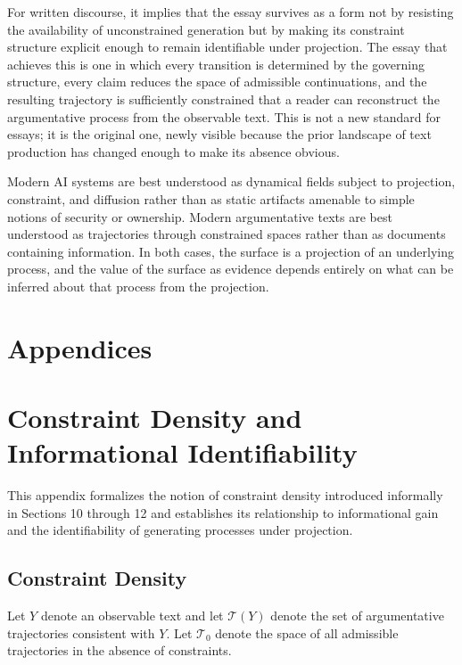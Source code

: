 \documentclass[12pt, oneside]{article}
\theoremstyle{plain}
\theoremstyle{definition}
\theoremstyle{remark}
\begin{document}
For written discourse, it implies that the essay survives as a form not by resisting the
availability of unconstrained generation but by making its constraint structure explicit
enough to remain identifiable under projection. The essay that achieves this is one in
which every transition is determined by the governing structure, every claim reduces the
space of admissible continuations, and the resulting trajectory is sufficiently constrained
that a reader can reconstruct the argumentative process from the observable text. This is
not a new standard for essays; it is the original one, newly visible because the prior
landscape of text production has changed enough to make its absence obvious.

Modern AI systems are best understood as dynamical fields subject to projection, constraint,
and diffusion rather than as static artifacts amenable to simple notions of security or
ownership. Modern argumentative texts are best understood as trajectories through constrained
spaces rather than as documents containing information. In both cases, the surface is a
projection of an underlying process, and the value of the surface as evidence depends
entirely on what can be inferred about that process from the projection.

\newpage 
\section*{Appendices}

\appendix
\section{Constraint Density and Informational Identifiability}

This appendix formalizes the notion of constraint density introduced informally in
Sections 10 through 12 and establishes its relationship to informational gain and
the identifiability of generating processes under projection.

\subsection{Constraint Density}

Let $Y$ denote an observable text and let $\mathcal{T}(Y)$ denote the set of
argumentative trajectories consistent with $Y$. Let $\mathcal{T}_0$ denote the
space of all admissible trajectories in the absence of constraints.
\end{document}
